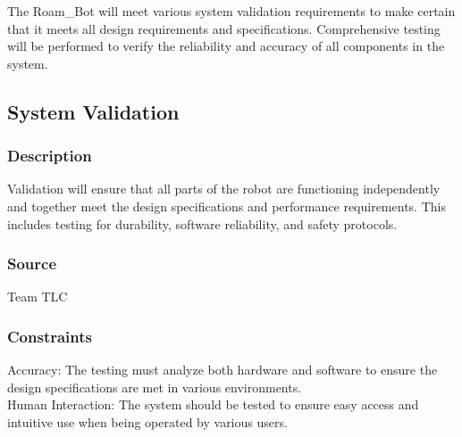 

The Roam\_Bot will meet various system validation requirements to make certain that it meets all design requirements and specifications. Comprehensive testing will be performed to verify the reliability and accuracy of all components in the system.



\subsection{System Validation}
\subsubsection{Description}
Validation will ensure that all parts of the robot are functioning independently and together meet the design specifications and performance requirements. This includes testing for durability, software reliability, and safety protocols.

\subsubsection{Source}
Team TLC

\subsubsection{Constraints}
Accuracy: The testing must analyze both hardware and software to ensure the design specifications are met in various environments.\\
Human Interaction: The system should be tested to ensure easy access and intuitive use when being operated by various users.

